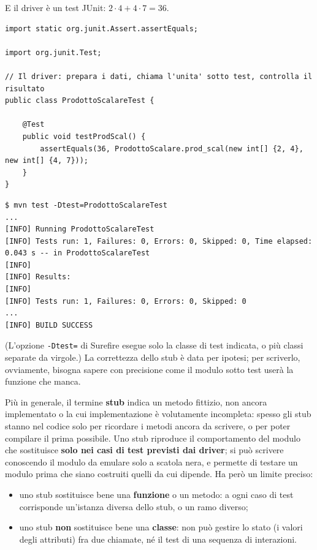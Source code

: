 E il driver è un test JUnit: $2 \cdot 4 + 4 \cdot 7 = 36$.

\begin{lstlisting}[style=java, name=ProdottoScalareTest.java]
import static org.junit.Assert.assertEquals;

import org.junit.Test;

// Il driver: prepara i dati, chiama l'unita' sotto test, controlla il risultato
public class ProdottoScalareTest {

    @Test
    public void testProdScal() {
        assertEquals(36, ProdottoScalare.prod_scal(new int[] {2, 4}, new int[] {4, 7}));
    }
}
\end{lstlisting}

\begin{lstlisting}[style=shell, name=Terminale]
$ mvn test -Dtest=ProdottoScalareTest
...
[INFO] Running ProdottoScalareTest
[INFO] Tests run: 1, Failures: 0, Errors: 0, Skipped: 0, Time elapsed: 0.043 s -- in ProdottoScalareTest
[INFO]
[INFO] Results:
[INFO]
[INFO] Tests run: 1, Failures: 0, Errors: 0, Skipped: 0
...
[INFO] BUILD SUCCESS
\end{lstlisting}

(L'opzione \texttt{-Dtest=} di Surefire esegue solo la classe di test indicata, o più classi separate da virgole.) La
correttezza dello stub è data per ipotesi; per scriverlo, ovviamente, bisogna sapere con precisione come il modulo
sotto test userà la funzione che manca.

Più in generale, il termine \textbf{stub} indica un metodo fittizio, non ancora implementato o la cui implementazione è
volutamente incompleta: spesso gli stub stanno nel codice solo per ricordare i metodi ancora da scrivere, o per poter
compilare il prima possibile. Uno stub riproduce il comportamento del modulo che sostituisce \textbf{solo nei casi di
test previsti dai driver}; si può scrivere conoscendo il modulo da emulare solo a scatola nera, e permette di testare un
modulo prima che siano costruiti quelli da cui dipende. Ha però un limite preciso:

\begin{itemize}
  \item uno stub sostituisce bene una \textbf{funzione} o un metodo: a ogni caso di test corrisponde un'istanza diversa
        dello stub, o un ramo diverso;
  \item uno stub \textbf{non} sostituisce bene una \textbf{classe}: non può gestire lo stato (i valori degli attributi)
        fra due chiamate, né il test di una sequenza di interazioni.
\end{itemize}

